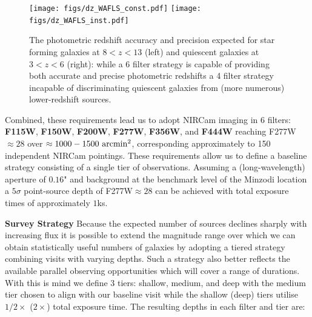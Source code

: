 \documentclass[12pt]{article}
\begin{document}
\begin{figure}[!h]
    \centering
    \texttt{[image: figs/dz\_WAFLS\_const.pdf]}
    \texttt{[image: figs/dz\_WAFLS\_inst.pdf]}
    \caption{The photometric redshift accuracy and precision expected for star forming galaxies at $8<z<13$ (left) and quiescent galaxies at $3<z<6$ (right): while a 6 filter strategy is capable of providing both accurate and precise photometric redshifts a 4 filter strategy incapable of discriminating quiescent galaxies from (more numerous) lower-redshift sources.}
    \label{fig:pz}
\end{figure}
\noindent
Combined, these requirements lead us to adopt NIRCam imaging in 6 filters: {\bf F115W}, {\bf F150W}, {\bf F200W}, {\bf F277W}, {\bf F356W}, and {\bf F444W} reaching F277W$\approx 28$ over $\approx 1000-1500\ {\rm arcmin^2}$, corresponding approximately to 150 independent NIRCam pointings. These requirements allow us to define a baseline strategy consisting of a single tier of observations. Assuming a (long-wavelength) aperture of $0.16$" and background at the benchmark level of the Minzodi location a $5\sigma$ point-source depth of F277W$\approx 28$ can be achieved with total exposure times of approximately $1$ks. 

\noindent
\textbf{Survey Strategy} Because the expected number of sources declines sharply with increasing flux it is possible to extend the magnitude range over which we can obtain statistically useful numbers of galaxies by adopting a tiered strategy combining visits with varying depths. Such a strategy also better reflects the available parallel observing opportunities which will cover a range of durations. With this is mind we define 3 tiers: shallow, medium, and deep with the medium tier chosen to align with our baseline visit while the shallow (deep) tiers utilise $1/2\times$ ($2\times$) total exposure time. The resulting depths in each filter and tier are: 
\end{document}
